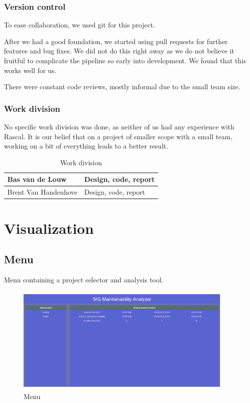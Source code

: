 \documentclass{article}
\begin{document}
\subsubsection{Version control}
To ease collaboration, we used git for this project.

After we had a good foundation, we started using pull requests for further features and bug fixes. We did not do this right away as we do not believe it fruitful to complicate the pipeline so early into development. We found that this works well for us.

There were constant code reviews, mostly informal due to the small team size.

\subsubsection{Work division}
No specific work division was done, as neither of us had any experience with Rascal. It is our belief that on a project of smaller scope with a small team, working on a bit of everything leads to a better result.

\begin{table}[h!tbp]
	\caption{Work division}
	\begin{tabular}{l|l}
		\hline
		Bas van de Louw      & Design, code, report \\
		\hline
		Brent Van Handenhove & Design, code, report \\
		\hline
	\end{tabular}
\end{table}




\clearpage
\appendix
\appendixpage{}

\section{Visualization}
\label{appendix:visualization}
\subsection{Menu}
Menu containing a project selector and analysis tool.
\begin{figure}[!htbp]
	\centering
	\label{fig:vis-menu}
	\caption{Menu}
	\includegraphics[width=400px, height=200px]{vis_menu.png}
\end{figure}
\end{document}
